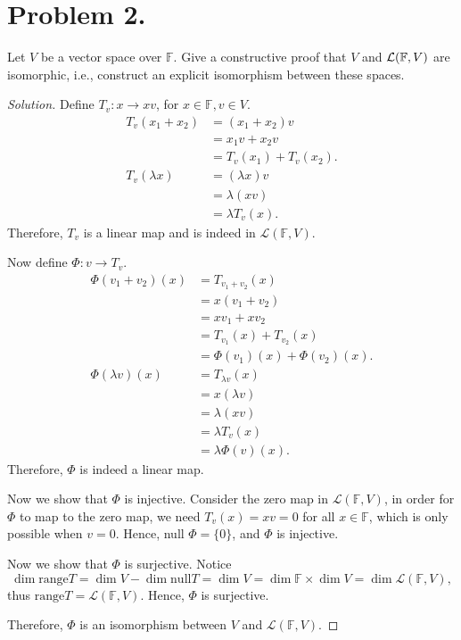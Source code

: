 \documentclass{article}
\begin{document}
\newpage
\section*{Problem 2.}
Let $V$ be a vector space over $\mathbb{F}$. Give a constructive proof that $V$ and 
${\cal L}(\mathbb{F}, V)$ are isomorphic, i.e., construct an explicit isomorphism between 
these spaces.
\begin{proof}[Solution]
    Define $T_v: x\to xv$, for $x\in\mathbb{F}, v\in V$. 
    \begin{align*}
        T_v(x_1+x_2) & = (x_1+x_2)v \\
        & = x_1v + x_2v \\
        & = T_v(x_1) + T_v(x_2). \\
        T_v(\lambda x) & = (\lambda x)v \\
        & = \lambda (xv) \\
        & = \lambda T_v(x).
    \end{align*}
    Therefore, $T_v$ is a linear map and is indeed in $\mathcal{L}(\mathbb{F}, V)$.

    Now define $\Phi:v\to T_v$. 
    \begin{align*}
        \Phi(v_1+v_2)(x) & = T_{v_1+v_2}(x) \\
        & = x(v_1+v_2) \\
        & = xv_1 + xv_2 \\
        & = T_{v_1}(x) + T_{v_2}(x) \\
        & = \Phi(v_1)(x) + \Phi(v_2)(x). \\
        \Phi(\lambda v)(x) & = T_{\lambda v}(x) \\
        & = x(\lambda v) \\
        & = \lambda (xv) \\
        & = \lambda T_v(x) \\
        & = \lambda \Phi(v)(x).
    \end{align*}
    Therefore, $\Phi$ is indeed a linear map.

    Now we show that $\Phi$ is injective. Consider the zero map in $\mathcal{L}(\mathbb{F}, V)$, 
    in order for $\Phi$ to map to the zero map, we need $T_v(x) = xv = 0$ for all $x\in\mathbb{F}$, which is 
    only possible when $v=0$. Hence, null $\Phi = \{0\}$, and $\Phi$ is injective.
    
    Now we show that $\Phi$ is surjective. Notice $$\dim \mathrm{range }T = \dim V - \dim \mathrm{null }T = \dim V
    = \dim \mathbb{F}\times \dim V = \dim \mathcal{L}(\mathbb{F}, V),$$
    thus $\mathrm{range }T = \mathcal{L}(\mathbb{F}, V)$. Hence, $\Phi$ is surjective.

    Therefore, $\Phi$ is an isomorphism between $V$ and $\mathcal{L}(\mathbb{F}, V)$.
\end{proof}
\end{document}
